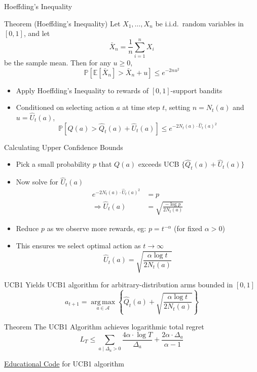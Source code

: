 \begin{frame}{Hoeffding's Inequality}
\begin{block}{Theorem (Hoeffding's Inequality)}
Let $X_1, \ldots, X_n$ be i.i.d.\ random variables in $[0, 1]$, and let
\[
    \bar{X}_n = \frac{1}{n} \sum_{i=1}^{n} X_i
\]
be the sample mean. Then for any $u \geq 0$,
\[
    \mathbb{P}\!\left[\mathbb{E}[\bar{X}_n] > \bar{X}_n + u\right] \leq e^{-2nu^2}
\]
\end{block}
\begin{itemize}
    \item Apply Hoeffding's Inequality to rewards of $[0, 1]$-support bandits
    \item Conditioned on selecting action $a$ at time step $t$, setting $n = N_t(a)$
          and $u = \hat{U}_t(a)$,
    \[
        \mathbb{P}\!\left[Q(a) > \hat{Q}_t(a) + \hat{U}_t(a)\right] \leq e^{-2 N_t(a) \cdot \hat{U}_t(a)^2}
    \]
\end{itemize}
\end{frame}

\begin{frame}{Calculating Upper Confidence Bounds}
\begin{itemize}
    \item Pick a small probability $p$ that $Q(a)$ exceeds UCB $\{\hat{Q}_t(a) + \hat{U}_t(a)\}$
    \item Now solve for $\hat{U}_t(a)$
    \begin{align*}
        e^{-2 N_t(a) \cdot \hat{U}_t(a)^2} &= p \\
        \Rightarrow \hat{U}_t(a) &= \sqrt{\frac{-\log p}{2 N_t(a)}}
    \end{align*}
    \item Reduce $p$ as we observe more rewards, eg: $p = t^{-\alpha}$ (for fixed $\alpha > 0$)
    \item This ensures we select optimal action as $t \to \infty$
    \[
        \hat{U}_t(a) = \sqrt{\frac{\alpha \log t}{2 N_t(a)}}
    \]
\end{itemize}
\end{frame}

\begin{frame}{UCB1}
Yields UCB1 algorithm for arbitrary-distribution arms bounded in
$[0, 1]$
\[
    a_{t+1} = \operatorname*{arg\,max}_{a \in \mathcal{A}} \left\{ \hat{Q}_t(a) + \sqrt{\frac{\alpha \log t}{2 N_t(a)}} \right\}
\]
\begin{block}{Theorem}
The UCB1 Algorithm achieves logarithmic total regret
\[
    L_T \leq \sum_{a \mid \Delta_a > 0} \frac{4\alpha \cdot \log T}{\Delta_a} + \frac{2\alpha \cdot \Delta_a}{\alpha - 1}
\]
\end{block}
\href{https://github.com/TikhonJelvis/RL-book/tree/master/rl/chapter14/ucb1.py}{Educational Code} for UCB1 algorithm
\end{frame}
